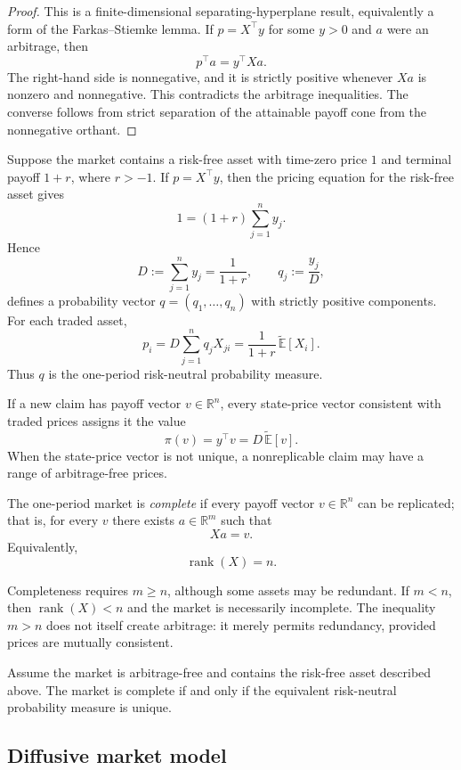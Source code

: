 \begin{proof}
This is a finite-dimensional separating-hyperplane result, equivalently a form of the Farkas--Stiemke lemma. If $p=X^\top y$ for some $y>0$ and $a$ were an arbitrage, then
\[
p^\top a=y^\top Xa.
\]
The right-hand side is nonnegative, and it is strictly positive whenever $Xa$ is nonzero and nonnegative. This contradicts the arbitrage inequalities. The converse follows from strict separation of the attainable payoff cone from the nonnegative orthant.
\end{proof}

Suppose the market contains a risk-free asset with time-zero price $1$ and terminal payoff $1+r$, where $r>-1$. If $p=X^\top y$, then the pricing equation for the risk-free asset gives
\[
1=(1+r)\sum_{j=1}^n y_j.
\]
Hence
\[
D:=\sum_{j=1}^n y_j=\frac{1}{1+r},
\qquad
q_j:=\frac{y_j}{D},
\]
defines a probability vector $q=(q_1,\ldots,q_n)$ with strictly positive components. For each traded asset,
\[
p_i=D\sum_{j=1}^n q_jX_{ji}
   =\frac{1}{1+r}\,\widetilde{\mathbb{E}}[X_i].
\]
Thus $q$ is the one-period risk-neutral probability measure.

If a new claim has payoff vector $v\in\mathbb{R}^n$, every state-price vector consistent with traded prices assigns it the value
\[
\pi(v)=y^\top v
      =D\,\widetilde{\mathbb{E}}[v].
\]
When the state-price vector is not unique, a nonreplicable claim may have a range of arbitrage-free prices.

\begin{de}
The one-period market is \emph{complete} if every payoff vector $v\in\mathbb{R}^n$ can be replicated; that is, for every $v$ there exists $a\in\mathbb{R}^m$ such that
\[
Xa=v.
\]
Equivalently,
\[
\operatorname{rank}(X)=n.
\]
\end{de}

Completeness requires $m\geq n$, although some assets may be redundant. If $m<n$, then $\operatorname{rank}(X)<n$ and the market is necessarily incomplete. The inequality $m>n$ does not itself create arbitrage: it merely permits redundancy, provided prices are mutually consistent.

\begin{thm}
Assume the market is arbitrage-free and contains the risk-free asset described above. The market is complete if and only if the equivalent risk-neutral probability measure is unique.
\end{thm}

\subsection{Diffusive market model}

